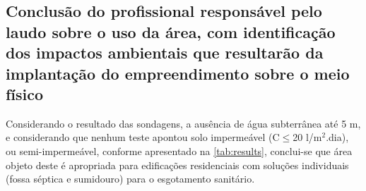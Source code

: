 \subsection{Conclusão do profissional responsável pelo laudo sobre o uso da área, com identificação dos impactos ambientais que resultarão da implantação do empreendimento sobre o meio físico}
%
%
%
%
%
%
%

Considerando o resultado das sondagens, a ausência de água
subterrânea até 5 m,
e considerando que
nenhum teste apontou solo impermeável (C$\leq$20 l/m$^2$.dia), 
ou semi-impermeável, conforme
apresentado na \cref{tab:results},  
conclui-se que
área objeto deste é apropriada para edificações residenciais  com soluções individuais
(fossa séptica e sumidouro) para o esgotamento sanitário.